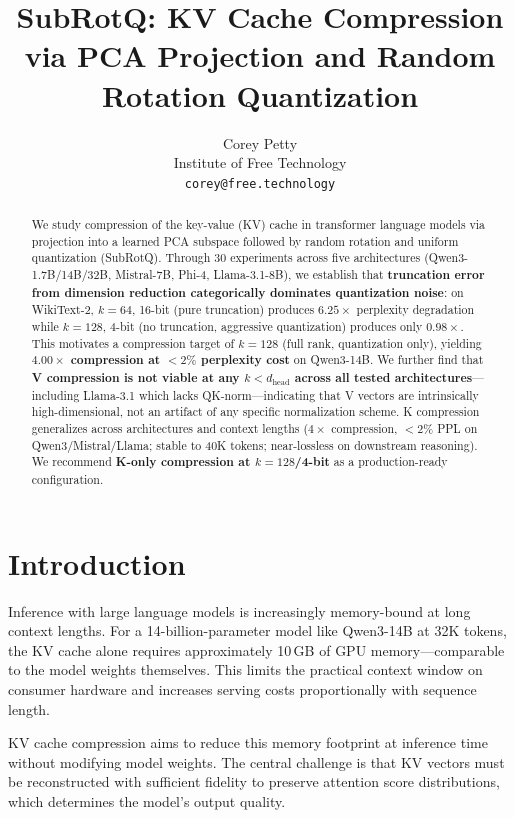 \documentclass{article}
\title{SubRotQ: KV Cache Compression\\via PCA Projection and Random Rotation Quantization}
\author{%
  Corey Petty \\
  Institute of Free Technology \\
  \texttt{corey@free.technology}
}
\begin{document}
\maketitle

\begin{abstract}
We study compression of the key-value (KV) cache in transformer language models
via projection into a learned PCA subspace followed by random rotation and
uniform quantization (SubRotQ). Through 30 experiments across five architectures
(Qwen3-1.7B/14B/32B, Mistral-7B, Phi-4, Llama-3.1-8B), we establish that
\textbf{truncation error from dimension reduction categorically dominates
quantization noise}: on WikiText-2, $k{=}64$, 16-bit (pure truncation) produces
$6.25{\times}$ perplexity degradation while $k{=}128$, 4-bit (no truncation,
aggressive quantization) produces only $0.98{\times}$. This motivates a compression
target of $k{=}128$ (full rank, quantization only), yielding \textbf{$4.00{\times}$
compression at $<2\%$ perplexity cost} on Qwen3-14B. We further find that
\textbf{V compression is not viable at any $k < d_\text{head}$ across all tested
architectures}---including Llama-3.1 which lacks QK-norm---indicating that V
vectors are intrinsically high-dimensional, not an artifact of any specific
normalization scheme. K compression generalizes across architectures and context
lengths ($4{\times}$ compression, ${<}2\%$ PPL on Qwen3/Mistral/Llama; stable to 40K
tokens; near-lossless on downstream reasoning). We recommend \textbf{K-only
compression at $k{=}128$/4-bit} as a production-ready configuration.
\end{abstract}

\section{Introduction}
\label{sec:intro}

Inference with large language models is increasingly memory-bound at long context
lengths. For a 14-billion-parameter model like Qwen3-14B at 32K tokens, the KV
cache alone requires approximately 10\,GB of GPU memory---comparable to the model
weights themselves. This limits the practical context window on consumer hardware
and increases serving costs proportionally with sequence length.

KV cache compression aims to reduce this memory footprint at inference time
without modifying model weights. The central challenge is that KV vectors must be
reconstructed with sufficient fidelity to preserve attention score distributions,
which determines the model's output quality.
\end{document}
